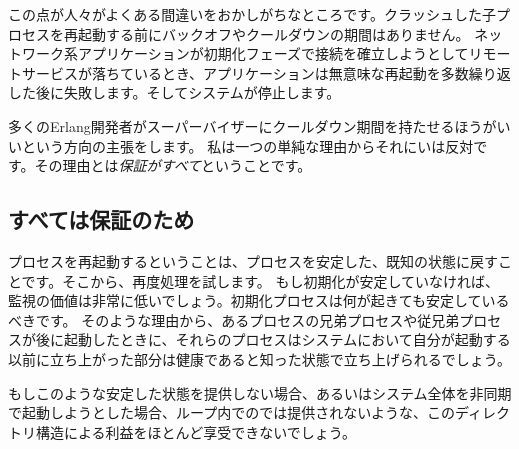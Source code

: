この点が人々がよくある間違いをおかしがちなところです。クラッシュした子プロセスを再起動する前にバックオフやクールダウンの期間はありません。
ネットワーク系アプリケーションが初期化フェーズで接続を確立しようとしてリモートサービスが落ちているとき、アプリケーションは無意味な再起動を多数繰り返した後に失敗します。そしてシステムが停止します。

多くのErlang開発者がスーパーバイザーにクールダウン期間を持たせるほうがいいという方向の主張をします。
私は一つの単純な理由からそれにいは反対です。その理由とは\emph{保証がすべて}ということです。

\subsection{すべては保証のため}
\label{subsec:start-link-guarantees}

プロセスを再起動するということは、プロセスを安定した、既知の状態に戻すことです。そこから、再度処理を試します。
もし初期化が安定していなければ、監視の価値は非常に低いでしょう。初期化プロセスは何が起きても安定しているべきです。
そのような理由から、あるプロセスの兄弟プロセスや従兄弟プロセスが後に起動したときに、それらのプロセスはシステムにおいて自分が起動する以前に立ち上がった部分は健康であると知った状態で立ち上げられるでしょう。

もしこのような安定した状態を提供しない場合、あるいはシステム全体を非同期で起動しようとした場合、ループ内でのでは提供されないような、このディレクトリ構造による利益をほとんど享受できないでしょう。

